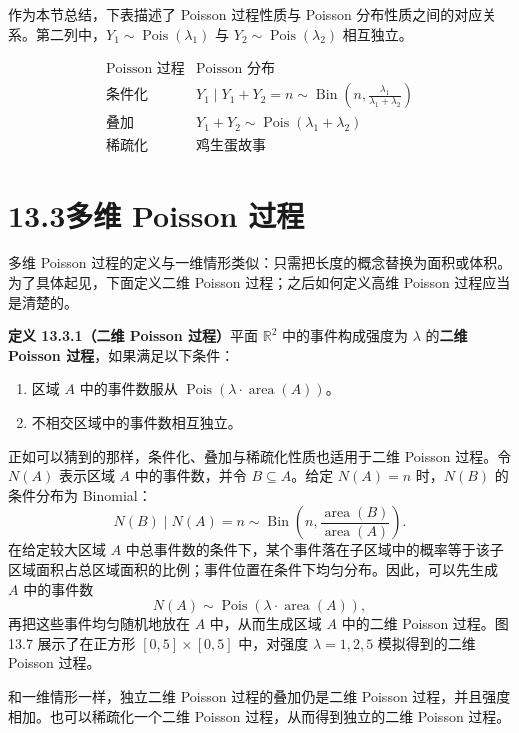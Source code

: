 \documentclass[UTF8,12pt,a4paper,fontset=fandol]{ctexart}
\begin{document}
作为本节总结，下表描述了 Poisson 过程性质与 Poisson 分布性质之间的对应关系。第二列中，$Y_1\sim\operatorname{Pois}(\lambda_1)$ 与 $Y_2\sim\operatorname{Pois}(\lambda_2)$ 相互独立。

\[
\begin{array}{c|c}
\text{Poisson 过程} & \text{Poisson 分布}\\
\hline
\text{条件化} &
Y_1\mid Y_1+Y_2=n\sim
\operatorname{Bin}\left(n,\frac{\lambda_1}{\lambda_1+\lambda_2}\right)\\
\text{叠加} & Y_1+Y_2\sim\operatorname{Pois}(\lambda_1+\lambda_2)\\
\text{稀疏化} & \text{鸡生蛋故事}
\end{array}
\]

\section*{13.3\quad 多维 Poisson 过程}

多维 Poisson 过程的定义与一维情形类似：只需把长度的概念替换为面积或体积。为了具体起见，下面定义二维 Poisson 过程；之后如何定义高维 Poisson 过程应当是清楚的。

\noindent\textbf{定义 13.3.1（二维 Poisson 过程）}\quad 平面 $\mathbb R^2$ 中的事件构成强度为 $\lambda$ 的\textbf{二维 Poisson 过程}，如果满足以下条件：
\begin{enumerate}
  \item 区域 $A$ 中的事件数服从 $\operatorname{Pois}(\lambda\cdot\operatorname{area}(A))$。
  \item 不相交区域中的事件数相互独立。
\end{enumerate}

正如可以猜到的那样，条件化、叠加与稀疏化性质也适用于二维 Poisson 过程。令 $N(A)$ 表示区域 $A$ 中的事件数，并令 $B\subseteq A$。给定 $N(A)=n$ 时，$N(B)$ 的条件分布为 Binomial：
\[
  N(B)\mid N(A)=n
  \sim
  \operatorname{Bin}\left(n,\frac{\operatorname{area}(B)}{\operatorname{area}(A)}\right).
\]
在给定较大区域 $A$ 中总事件数的条件下，某个事件落在子区域中的概率等于该子区域面积占总区域面积的比例；事件位置在条件下均匀分布。因此，可以先生成 $A$ 中的事件数
\[
  N(A)\sim\operatorname{Pois}(\lambda\cdot\operatorname{area}(A)),
\]
再把这些事件均匀随机地放在 $A$ 中，从而生成区域 $A$ 中的二维 Poisson 过程。图 13.7 展示了在正方形 $[0,5]\times[0,5]$ 中，对强度 $\lambda=1,2,5$ 模拟得到的二维 Poisson 过程。

和一维情形一样，独立二维 Poisson 过程的叠加仍是二维 Poisson 过程，并且强度相加。也可以稀疏化一个二维 Poisson 过程，从而得到独立的二维 Poisson 过程。
\end{document}
